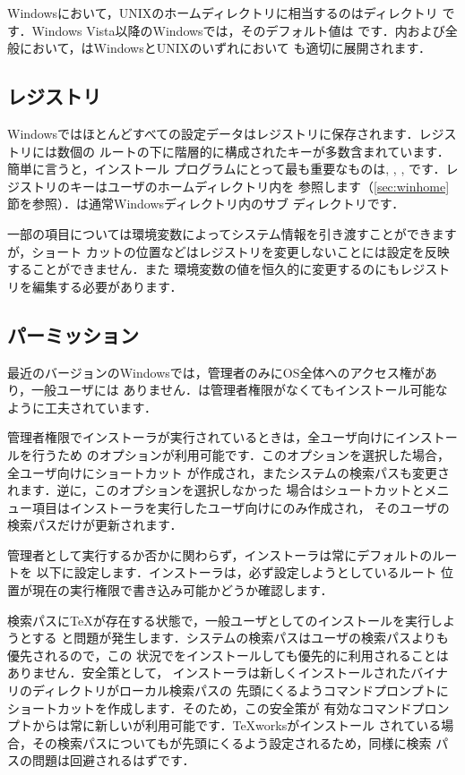 \documentclass[uplatex,dvipdfmx]{jsarticle}
\begin{document}
Windowsにおいて，UNIXのホームディレクトリに相当するのはディレクトリ
です．Windows Vista以降のWindowsでは，そのデフォルト値は%
です．内および\KPS 全般において，\dir{~}はWindowsとUNIXのいずれにおいて
も適切に展開されます．

\subsection{レジストリ}
\label{sec:registry}

Windowsではほとんどすべての設定データはレジストリに保存されます．レジストリには数個の
ルートの下に階層的に構成されたキーが多数含まれています．簡単に言うと，インストール
プログラムにとって最も重要なものは, ,
, です．レジストリのキーはユーザのホームディレクトリ内を
参照します（\ref{sec:winhome}節を参照）．は通常Windowsディレクトリ内のサブ
ディレクトリです．

一部の項目については環境変数によってシステム情報を引き渡すことができますが，ショート
カットの位置などはレジストリを変更しないことには設定を反映することができません．また
環境変数の値を恒久的に変更するのにもレジストリを編集する必要があります．

\subsection{パーミッション}
\label{sec:winpermissions}

最近のバージョンのWindowsでは，管理者のみにOS全体へのアクセス権があり，一般ユーザには
ありません．\TL は管理者権限がなくてもインストール可能なように工夫されています．

管理者権限でインストーラが実行されているときは，全ユーザ向けにインストールを行うため
のオプションが利用可能です．このオプションを選択した場合，全ユーザ向けにショートカット
が作成され，またシステムの検索パスも変更されます．逆に，このオプションを選択しなかった
場合はシュートカットとメニュー項目はインストーラを実行したユーザ向けにのみ作成され，
そのユーザの検索パスだけが更新されます．

管理者として実行するか否かに関わらず，インストーラは常にデフォルトの\TL ルートを
以下に設定します．インストーラは，必ず設定しようとしているルート
位置が現在の実行権限で書き込み可能かどうか確認します．

検索パスに\TeX が存在する状態で，一般ユーザとして\TL のインストールを実行しようとする
と問題が発生します．システムの検索パスはユーザの検索パスよりも優先されるので，この
状況で\TL をインストールしても優先的に利用されることはありません．安全策として，
インストーラは新しくインストールされた\TL バイナリのディレクトリがローカル検索パスの
先頭にくるようコマンドプロンプトにショートカットを作成します．そのため，この安全策が
有効なコマンドプロンプトからは常に新しい\TL が利用可能です．\TeX worksがインストール
されている場合，その検索パスについても\TL が先頭にくるよう設定されるため，同様に検索
パスの問題は回避されるはずです．
\end{document}
